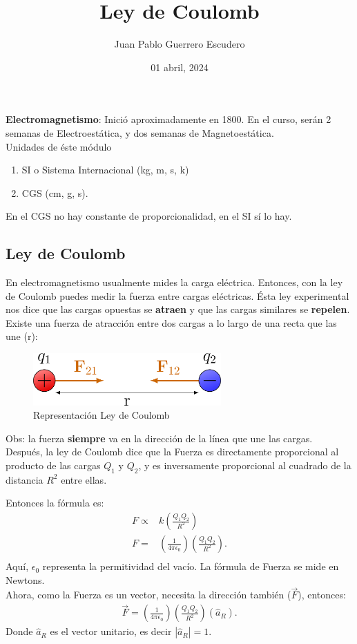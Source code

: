 \documentclass[12pt, letterpaper]{report}
\title{Ley de Coulomb}
\author{Juan Pablo Guerrero Escudero}
\date{01 abril, 2024}
\begin{document}
\maketitle
\textbf{Electromagnetismo}: Inició aproximadamente en 1800. En el curso, serán 2 semanas de Electroestática, 
y dos semanas de Magnetoestática. \\

Unidades de éste módulo
\begin{enumerate}
\item SI o Sistema Internacional (kg, m, s, k)
\item CGS (cm, g, s). 
\end{enumerate}
En el CGS no hay constante de proporcionalidad, en el SI sí lo hay.
\subsection*{Ley de Coulomb}
En electromagnetismo usualmente mides la carga eléctrica. Entonces, con la ley de Coulomb puedes medir 
la fuerza entre cargas eléctricas. Ésta ley experimental nos dice que las cargas opuestas se \textbf{atraen} y 
que las cargas similares se \textbf{repelen}. \\
Existe una fuerza de atracción entre dos cargas a lo largo de una recta que las une (r): 
\begin{figure}[H]
    \centering
    \includegraphics[height = 2cm]{coulomb_force.png}
    \caption{Representación Ley de Coulomb}
\end{figure}
Obs: la fuerza \textbf{siempre} va en la dirección de la línea que une las cargas. \\
Después, la ley de Coulomb dice que la Fuerza es directamente proporcional al producto de las cargas $Q_1$ y $Q_2$, y 
es inversamente proporcional al cuadrado de la distancia $R^2$ entre ellas. 

Entonces la fórmula es: 
\begin{align*}
F \propto& k(\frac{Q_1Q_2}{R^2}) \\ 
F =& (\frac{1}{4\pi \epsilon_0})(\frac{Q_1Q_2}{R^2}). \\
\end{align*}
Aquí, $\epsilon_0$ representa la permitividad del vacío. La fórmula de Fuerza se mide en Newtons. \\
Ahora, como la Fuerza es un vector, necesita la dirección también ($\vec{F}$), entonces: 
\begin{align*}
    \vec{F} = (\frac{1}{4\pi \epsilon_0})(\frac{Q_1Q_2}{R^2})(\hat{a}_R). 
\end{align*} Donde $\hat{a}_R$ es el vector unitario, es decir $|\hat{a}_R| = 1$. \\
\end{document}

